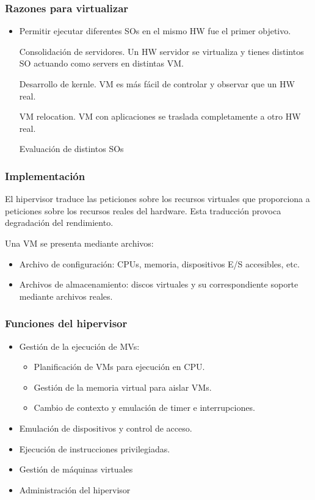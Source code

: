 \documentclass{article}
\begin{document}
		\subsubsection{Razones para virtualizar}
			\begin{itemize}
			\item Permitir ejecutar diferentes SOs en el mismo HW fue el primer objetivo.
			
			Consolidación de servidores. Un HW servidor se virtualiza y tienes distintos SO actuando como servers en distintas VM.
			
			Desarrollo de kernle. VM es más fácil de controlar y observar que un HW real.
			
			VM relocation. VM con aplicaciones se traslada completamente a otro HW real.
			
			Evaluación de distintos SOs
			\end{itemize}
			
		\subsubsection{Implementación}
			El hipervisor traduce las peticiones sobre los recursos virtuales que proporciona a peticiones sobre los recursos reales del hardware. Esta traducción provoca degradación del rendimiento. 
			
			Una VM se presenta mediante archivos:
			
			\begin{itemize}
			\item Archivo de configuración: CPUs, memoria, dispositivos E/S accesibles, etc.
			\item Archivos de almacenamiento: discos virtuales y su correspondiente soporte mediante archivos reales.
			\end{itemize}
			
		\subsubsection{Funciones del hipervisor}
			\begin{itemize}
			\item Gestión de la ejecución de MVs:
				\begin{itemize}
				\item Planificación de VMs para ejecución en CPU.
				\item Gestión de la memoria virtual para aislar VMs.
				\item Cambio de contexto y emulación de timer e interrupciones.
				\end{itemize}
				
			\item Emulación de dispositivos y control de acceso.
			\item Ejecución de instrucciones privilegiadas.
			\item Gestión de máquinas virtuales
			\item Administración del hipervisor
			\end{itemize}
			
\end{document}
